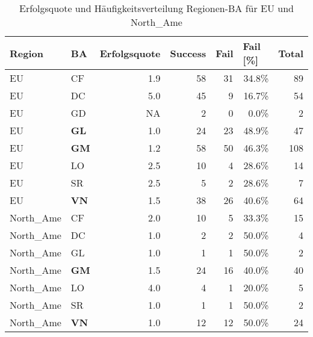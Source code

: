 \begin{table}[H]
	\centering
	\caption{Erfolgsquote und Häufigkeitsverteilung Regionen-BA für EU und North\_Ame}
	\begin{tabular}{llrrrrr}
		\toprule
		\textbf{Region} & \textbf{BA}    & \multicolumn{1}{l}{\textbf{Erfolgsquote}} & \multicolumn{1}{l}{\textbf{Success}} & \multicolumn{1}{l}{\textbf{Fail}} & \multicolumn{1}{l}{\textbf{Fail [\%]}} & \multicolumn{1}{l}{\textbf{Total}} \\
		\midrule
		EU    & CF    & 1.9   & 58    & 31    & 34.8\% & 89 \\
		EU    & DC    & 5.0   & 45    & 9     & 16.7\% & 54 \\
		EU    & GD    & NA    & 2     & 0     & 0.0\% & 2 \\
		EU    & \textbf{GL}    & 1.0   & 24    & 23    & 48.9\% & 47 \\
		EU    & \textbf{GM}  & 1.2   & 58    & 50    & 46.3\% & 108 \\
		EU    & LO    & 2.5   & 10    & 4     & 28.6\% & 14 \\
		EU    & SR    & 2.5   & 5     & 2     & 28.6\% & 7 \\
		EU    & \textbf{VN}     & 1.5   & 38    & 26    & 40.6\% & 64 \\\hline
		North\_Ame & CF    & 2.0   & 10    & 5     & 33.3\% & 15 \\
		North\_Ame & DC    & 1.0   & 2     & 2     & 50.0\% & 4 \\
		North\_Ame & GL    & 1.0   & 1     & 1     & 50.0\% & 2 \\
		North\_Ame & \textbf{GM}   & 1.5   & 24    & 16    & 40.0\% & 40 \\
		North\_Ame & LO    & 4.0   & 4     & 1     & 20.0\% & 5 \\
		North\_Ame & SR    & 1.0   & 1     & 1     & 50.0\% & 2 \\
		North\_Ame & \textbf{VN}  & 1.0   & 12    & 12    & 50.0\% & 24 \\
		\bottomrule
	\end{tabular}%
	\label{tab:fregba}%
\end{table}%
\clearpage
